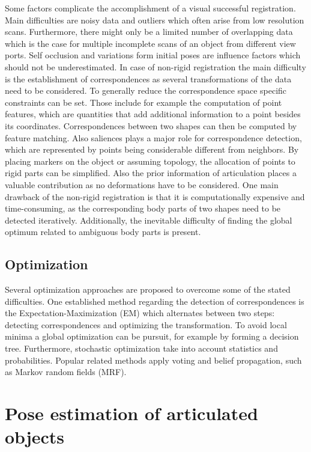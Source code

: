 Some factors complicate the accomplishment of a visual successful registration. Main difficulties are noisy data and outliers which often arise from low resolution scans. Furthermore, there might only be a limited number of overlapping data which is the case for multiple incomplete scans of an object from different view ports. Self occlusion and variations form initial poses are influence factors which should not be underestimated. In case of non-rigid registration the main difficulty is the establishment of correspondences as several transformations of the data need to be considered. To generally reduce the correspondence space specific constraints can be set. Those include for example the computation of point features, which are quantities that add additional information to a point besides its coordinates. Correspondences between two shapes can then be computed by feature matching. Also saliences plays a major role for correspondence detection, which are represented by points being considerable different from neighbors. By placing markers on the object or assuming topology, the allocation of points to rigid parts can be simplified. Also the prior information of articulation places a valuable contribution as no deformations have to be considered. 
One main drawback of the non-rigid registration is that it is computationally expensive and time-consuming, as the corresponding body parts of two shapes need to be detected iteratively. Additionally, the inevitable difficulty of finding the global optimum related to ambiguous body parts is present.

\subsection{Optimization}

Several optimization approaches are proposed to overcome some of the stated difficulties. One established method regarding the detection of correspondences is the Expectation-Maximization (EM) which alternates between two steps: detecting correspondences and optimizing the transformation. To avoid local minima a global optimization can be pursuit, for example by forming a decision tree. Furthermore, stochastic optimization take into account statistics and probabilities. Popular related methods apply voting and belief propagation, such as Markov random fields (MRF). 
%
\section{Pose estimation of articulated objects}

